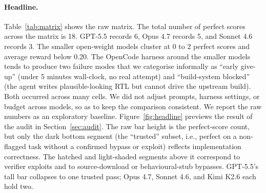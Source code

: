 \documentclass{article}
\begin{document}
\paragraph{Headline.}
Table~\ref{tab:matrix} shows the raw matrix. The total number of perfect scores across the
matrix is 18. GPT-5.5 records 6, Opus 4.7 records 5, and Sonnet 4.6 records 3. The smaller
open-weight models cluster at 0 to 2 perfect scores and average reward below 0.20. The
OpenCode harness around the smaller models tends to produce two failure modes that we
categorise informally as ``early give-up'' (under 5 minutes wall-clock, no real attempt) and
``build-system blocked'' (the agent writes plausible-looking RTL but cannot drive the
upstream build). Both occurred across many cells. We did not adjust prompts, harness
settings, or budget across models, so as to keep the comparison consistent. We report the
raw numbers as an exploratory baseline. Figure~\ref{fig:headline} previews the result of
the audit in Section~\ref{sec:audit}. The raw bar height is the perfect-score count, but
only the dark bottom segment (the ``trusted'' subset, i.e., perfect on a non-flagged task
without a confirmed bypass or exploit) reflects implementation correctness. The hatched and
light-shaded segments above it correspond to verifier exploits and to source-download or
behavioural-stub bypasses. GPT-5.5's tall bar collapses to one trusted pass; Opus 4.7,
Sonnet 4.6, and Kimi K2.6 each hold two.
\end{document}
